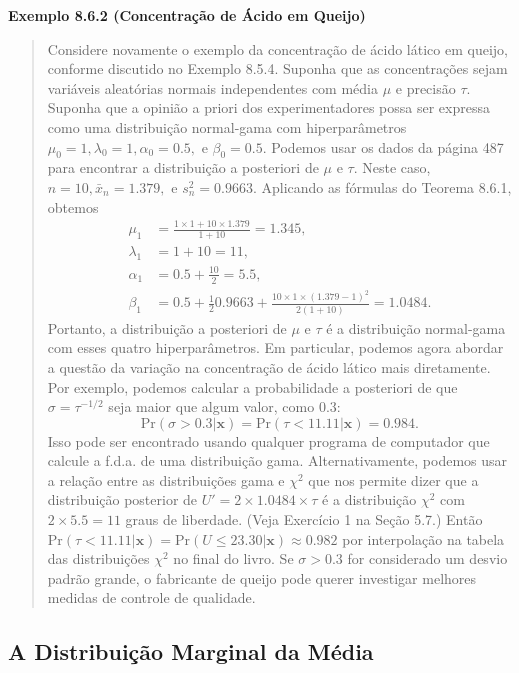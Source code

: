 \vspace{1em}
\noindent\textbf{Exemplo 8.6.2 (Concentração de Ácido em Queijo)}
\begin{quote}
    Considere novamente o exemplo da concentração de ácido lático em queijo, conforme discutido no Exemplo 8.5.4. Suponha que as concentrações sejam variáveis aleatórias normais independentes com média $\mu$ e precisão $\tau$. Suponha que a opinião a priori dos experimentadores possa ser expressa como uma distribuição normal-gama com hiperparâmetros $\mu_0=1, \lambda_0=1, \alpha_0=0.5,$ e $\beta_0=0.5$. Podemos usar os dados da página 487 para encontrar a distribuição a posteriori de $\mu$ e $\tau$. Neste caso, $n=10, \bar{x}_n = 1.379,$ e $s_n^2 = 0.9663$. Aplicando as fórmulas do Teorema 8.6.1, obtemos
    \begin{align*}
        \mu_1 &= \frac{1 \times 1 + 10 \times 1.379}{1+10} = 1.345, \\
        \lambda_1 &= 1 + 10 = 11, \\
        \alpha_1 &= 0.5 + \frac{10}{2} = 5.5, \\
        \beta_1 &= 0.5 + \frac{1}{2}0.9663 + \frac{10 \times 1 \times (1.379-1)^2}{2(1+10)} = 1.0484.
    \end{align*}
    Portanto, a distribuição a posteriori de $\mu$ e $\tau$ é a distribuição normal-gama com esses quatro hiperparâmetros. Em particular, podemos agora abordar a questão da variação na concentração de ácido lático mais diretamente. Por exemplo, podemos calcular a probabilidade a posteriori de que $\sigma = \tau^{-1/2}$ seja maior que algum valor, como 0.3:
    \[
    \text{Pr}(\sigma > 0.3|\mathbf{x}) = \text{Pr}(\tau < 11.11|\mathbf{x}) = 0.984.
    \]
    Isso pode ser encontrado usando qualquer programa de computador que calcule a f.d.a. de uma distribuição gama. Alternativamente, podemos usar a relação entre as distribuições gama e $\chi^2$ que nos permite dizer que a distribuição posterior de $U' = 2 \times 1.0484 \times \tau$ é a distribuição $\chi^2$ com $2 \times 5.5 = 11$ graus de liberdade. (Veja Exercício 1 na Seção 5.7.) Então $\text{Pr}(\tau < 11.11|\mathbf{x}) = \text{Pr}(U \le 23.30|\mathbf{x}) \approx 0.982$ por interpolação na tabela das distribuições $\chi^2$ no final do livro. Se $\sigma > 0.3$ for considerado um desvio padrão grande, o fabricante de queijo pode querer investigar melhores medidas de controle de qualidade.
\end{quote}
\vspace{1em}

\subsection*{A Distribuição Marginal da Média}

